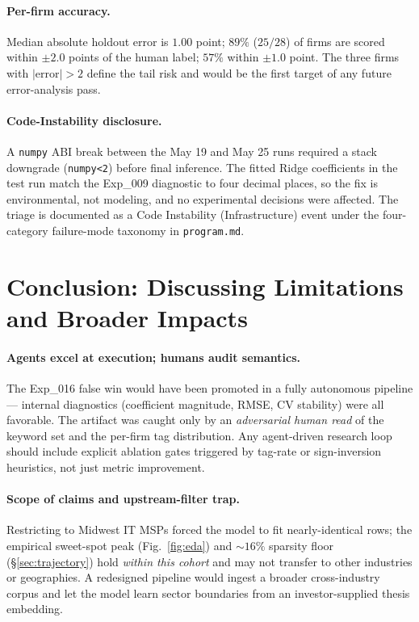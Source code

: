 \documentclass{article}
\begin{document}
\paragraph{Per-firm accuracy.}
Median absolute holdout error is $1.00$ point; $89\%$ ($25/28$) of firms are scored within
$\pm 2.0$ points of the human label; $57\%$ within $\pm 1.0$ point. The three firms with
$|\text{error}|>2$ define the tail risk and would be the first target of any future
error-analysis pass.

\paragraph{Code-Instability disclosure.}
A \texttt{numpy} ABI break between the May 19 and May 25 runs required a stack downgrade
(\texttt{numpy<2}) before final inference. The fitted Ridge coefficients in the test run
match the Exp\_009 diagnostic to four decimal places, so the fix is environmental, not
modeling, and no experimental decisions were affected. The triage is documented as a
Code Instability (Infrastructure) event under the four-category failure-mode taxonomy in
\texttt{program.md}.

\section{Conclusion: Discussing Limitations and Broader Impacts}
\label{sec:limitations}

\paragraph{Agents excel at execution; humans audit semantics.}
The Exp\_016 false win would have been promoted in a fully autonomous pipeline --- internal
diagnostics (coefficient magnitude, RMSE, CV stability) were all favorable. The artifact
was caught only by an \emph{adversarial human read} of the keyword set and the per-firm
tag distribution. Any agent-driven research loop should include explicit ablation gates
triggered by tag-rate or sign-inversion heuristics, not just metric improvement.

\paragraph{Scope of claims and upstream-filter trap.}
Restricting to Midwest IT MSPs forced the model to fit nearly-identical rows; the
empirical sweet-spot peak (Fig.~\ref{fig:eda}) and $\sim 16\%$ sparsity floor
(\S\ref{sec:trajectory}) hold \emph{within this cohort} and may not transfer to other
industries or geographies. A redesigned pipeline would ingest a broader cross-industry
corpus and let the model learn sector boundaries from an investor-supplied thesis
embedding.
\end{document}
